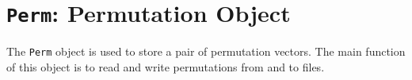 \chapter{{\tt Perm}: Permutation Object}
\par
The {\tt Perm} object is used to store a pair of permutation vectors.
The main function of this object is to read and write permutations 
from and to files. 

